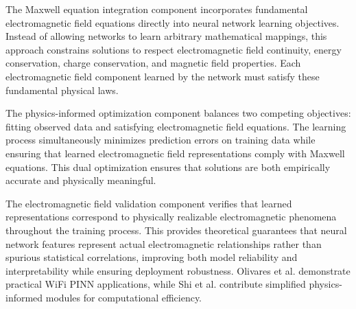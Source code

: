 \documentclass[journal]{IEEEtran}
\begin{document}
The Maxwell equation integration component incorporates fundamental electromagnetic field equations directly into neural network learning objectives. Instead of allowing networks to learn arbitrary mathematical mappings, this approach constrains solutions to respect electromagnetic field continuity, energy conservation, charge conservation, and magnetic field properties. Each electromagnetic field component learned by the network must satisfy these fundamental physical laws.

The physics-informed optimization component balances two competing objectives: fitting observed data and satisfying electromagnetic field equations. The learning process simultaneously minimizes prediction errors on training data while ensuring that learned electromagnetic field representations comply with Maxwell equations. This dual optimization ensures that solutions are both empirically accurate and physically meaningful.

The electromagnetic field validation component verifies that learned representations correspond to physically realizable electromagnetic phenomena throughout the training process. This provides theoretical guarantees that neural network features represent actual electromagnetic relationships rather than spurious statistical correlations, improving both model reliability and interpretability while ensuring deployment robustness. Olivares et al. \cite{olivares2021applications} demonstrate practical WiFi PINN applications, while Shi et al. \cite{shi2023simplified} contribute simplified physics-informed modules for computational efficiency.
\end{document}
